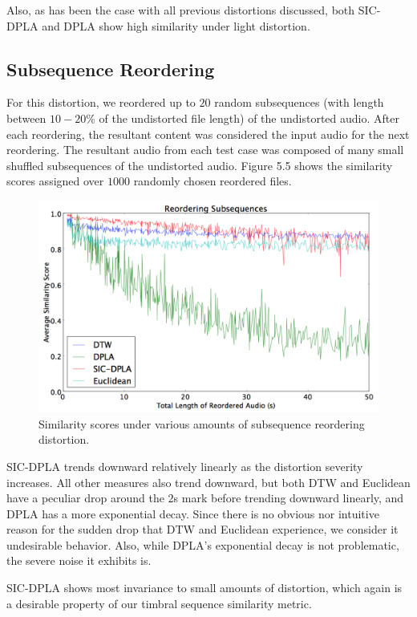 \documentclass[12pt]{report} 	%
\numberwithin{figure}{chapter}
\numberwithin{table}{chapter}
\numberwithin{equation}{chapter}
\begin{document}
\begin{flushleft}
Also, as has been the case with all previous distortions discussed, both SIC-DPLA and DPLA show high similarity under light distortion.

\subsection{Subsequence Reordering}
For this distortion, we reordered up to $20$ random subsequences (with length between $10-20\%$ of the undistorted file length) of the undistorted audio. After each reordering, the resultant content was considered the input audio for the next reordering. The resultant audio from each test case was composed of many small shuffled subsequences of the undistorted audio. Figure 5.5 shows the similarity scores assigned over $1000$ randomly chosen reordered files.
\begin{figure}[h!]
\begin{center}
\includegraphics[scale=0.5,width=\linewidth]{ReorderedAudio}
\caption[Subsequence reordering results]{Similarity scores under various amounts of subsequence reordering distortion.}
\end{center}
\end{figure}
SIC-DPLA trends downward relatively linearly as the distortion severity increases. All other measures also trend downward, but both DTW and Euclidean have a peculiar drop around the $2$s mark before trending downward linearly, and DPLA has a more exponential decay. Since there is no obvious nor intuitive reason for the sudden drop that DTW and Euclidean experience, we consider it undesirable behavior. Also, while DPLA's exponential decay is not problematic, the severe noise it exhibits is.

SIC-DPLA shows most invariance to small amounts of distortion, which again is a desirable property of our timbral sequence similarity metric.


\end{flushleft}
\end{document}
